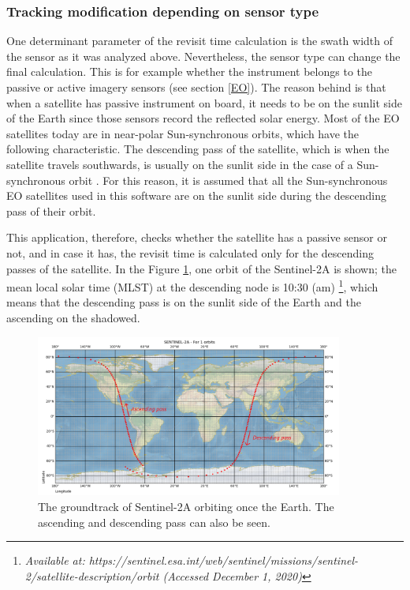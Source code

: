 \subsubsection{Tracking modification depending on sensor type}
\bigskip

One determinant parameter of the revisit time calculation is the swath width of the sensor as it was analyzed above. Nevertheless, the sensor type can change the final calculation. This is for example whether the instrument belongs to the passive or active imagery sensors (see section \ref{EO}). The reason behind is that when a satellite has passive instrument on board, it needs to be on the sunlit side of the Earth since those sensors record the reflected solar energy. Most of the EO satellites today are in near-polar Sun-synchronous orbits, which have the following characteristic. The descending pass of the satellite, which is when the satellite travels southwards, is usually on the sunlit side in the case of a Sun-synchronous orbit \cite{Kramer 2002}. For this reason, it is assumed that all the Sun-synchronous EO satellites used in this software are on the sunlit side during the descending pass of their orbit.

This application, therefore, checks whether the satellite has a passive sensor or not, and in case it has, the revisit time is calculated only for the descending passes of the satellite. In the Figure \ref{ascending-descending}, one orbit of the Sentinel-2A is shown; the mean local solar time (MLST) at the descending node is 10:30 (am) \footnote{\label{MLST_Sentinel2}\textit{Available at: https://sentinel.esa.int/web/sentinel/missions/sentinel-2/satellite-description/orbit (Accessed December 1, 2020)}}, which means that the descending pass is on the sunlit side of the Earth and the ascending on the shadowed.

\begin{figure}
\centering
\includegraphics[width=0.9\textwidth]{Images/ascending-descending.png}\caption{The groundtrack of Sentinel-2A orbiting once the Earth. The ascending and descending pass can also be seen.}
\label{ascending-descending}
\end{figure}

